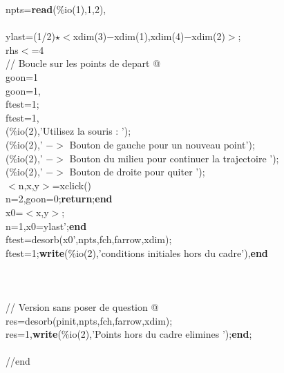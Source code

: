 {\begin{flushleft}
{\cmarg \hspace{0.5cm}npts={\bf read}(\%io(1),1,2),\\ 
\\ 
\cmarg ylast=(1/2)$\star$$<$xdim(3)$-$xdim(1),xdim(4)$-$xdim(2)$>$;\\ 
 rhs$<$=4\\ 
\cmarg \verb@// Boucle sur les points de depart @\\ 
\cmarg \hspace{0.5cm}goon=1\\ 
\cmarg \hspace{0.5cm}{\bf while} goon=1,\\ 
\cmarg \hspace{1.8cm}ftest=1;\\ 
\cmarg \hspace{1.8cm}{\bf while} ftest=1,\\ 
\cmarg \hspace{2.5cm}{\bf write}(\%io(2),'Utilisez la souris : ');\\ 
\cmarg \hspace{2.5cm}{\bf write}(\%io(2),' $-$$>$ Bouton de gauche pour un nouveau point');\\ 
\cmarg \hspace{2.5cm}{\bf write}(\%io(2),' $-$$>$ Bouton du milieu pour continuer la trajectoire ');\\ 
\cmarg \hspace{2.5cm}{\bf write}(\%io(2),' $-$$>$ Bouton de droite pour quiter ');\\ 
\cmarg \hspace{2.5cm}$<$n,x,y$>$=xclick()\\ 
\cmarg \hspace{2.5cm}{\bf if} n=2,goon=0;{\bf return};{\bf end}\\ 
\cmarg \hspace{2.5cm}x0=$<$x,y$>$;\\ 
\cmarg \hspace{2.5cm}{\bf if} n=1,x0=ylast';{\bf end} \\ 
\cmarg \hspace{2.5cm}ftest=desorb(x0',npts,fch,farrow,xdim);\\ 
\cmarg \hspace{2.5cm}{\bf if} ftest=1;{\bf write}(\%io(2),'conditions initiales hors du cadre'),{\bf end}\\ 
\cmarg \hspace{1.8cm}{\bf end}\\ 
\cmarg \hspace{0.5cm}{\bf end}\\ 
\\ 
\cmarg \verb@// Version sans poser de question @\\ 
\cmarg res=desorb(pinit,npts,fch,farrow,xdim);\\ 
 res=1,{\bf write}(\%io(2),'Points hors du cadre elimines ');{\bf end};\\ 
\\ 
\cmarg //end}
\end{flushleft}}




